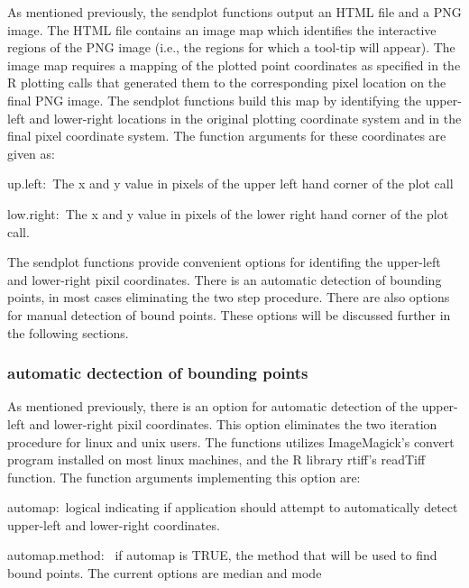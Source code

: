 \documentclass[]{article}
\begin{document}
As mentioned previously, the sendplot functions output an HTML file and a PNG image. The HTML file contains an image map which identifies the interactive regions of the PNG image (i.e., the regions for which a tool-tip will appear). The image map requires a mapping of the plotted point coordinates as specified in the R plotting calls that generated them to the corresponding pixel location on the final PNG image. The sendplot functions build this map by identifying the upper-left and lower-right locations in the original plotting coordinate system and in the final pixel coordinate system. The function arguments for these coordinates are given as:
\begin{description}
  \item{up.left:~}{The x and y value in pixels of the upper left hand
    corner of the plot call}
  \item{low.right:~}{The x and y value in pixels of the lower right hand
    corner of the plot call.}
\end{description}

\indent The sendplot functions provide convenient options for identifing the upper-left and lower-right pixil coordinates. There is an automatic detection of bounding points, in most cases eliminating the two step procedure. There are also options for manual detection of bound points. These options will be discussed further in the following sections.  

\subsubsection{automatic dectection of bounding points}

\indent As mentioned previously, there is an option for automatic detection of the upper-left and lower-right pixil coordinates. This option eliminates the two iteration procedure for linux and unix users. The functions utilizes ImageMagick's convert program installed on most linux machines, and the R library rtiff's readTiff function. The function arguments implementing this option are:
\begin{description}
 \item{automap:~}{logical indicating if application should
    attempt to automatically detect upper-left and lower-right 
    coordinates.}

  \item{automap.method:~ }{if automap is TRUE, the method that will be
    used to find bound points. The current options are median and mode}

 \end{description}
\end{document}
